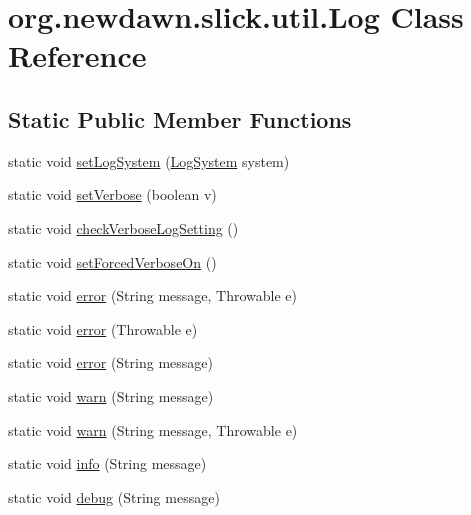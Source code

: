 \hypertarget{classorg_1_1newdawn_1_1slick_1_1util_1_1_log}{}\section{org.\+newdawn.\+slick.\+util.\+Log Class Reference}
\label{classorg_1_1newdawn_1_1slick_1_1util_1_1_log}
\subsection*{Static Public Member Functions}
\begin{DoxyCompactItemize}
\item 
static void \mbox{\hyperlink{classorg_1_1newdawn_1_1slick_1_1util_1_1_log_a74c387a36803509c62b7b7e1e6415c1c}{set\+Log\+System}} (\mbox{\hyperlink{interfaceorg_1_1newdawn_1_1slick_1_1util_1_1_log_system}{Log\+System}} system)
\item 
static void \mbox{\hyperlink{classorg_1_1newdawn_1_1slick_1_1util_1_1_log_a0d73ddb12d5b83e05963129645067699}{set\+Verbose}} (boolean v)
\item 
static void \mbox{\hyperlink{classorg_1_1newdawn_1_1slick_1_1util_1_1_log_aeb42cb2c3abf9a72353199c7dabe3b78}{check\+Verbose\+Log\+Setting}} ()
\item 
static void \mbox{\hyperlink{classorg_1_1newdawn_1_1slick_1_1util_1_1_log_a87cd4bd74b579277c3e0a6083868b324}{set\+Forced\+Verbose\+On}} ()
\item 
static void \mbox{\hyperlink{classorg_1_1newdawn_1_1slick_1_1util_1_1_log_af7c392bb99b0afd00b28d89fffd70a11}{error}} (String message, Throwable e)
\item 
static void \mbox{\hyperlink{classorg_1_1newdawn_1_1slick_1_1util_1_1_log_a549d8d55defc0302044e2c05d69ba486}{error}} (Throwable e)
\item 
static void \mbox{\hyperlink{classorg_1_1newdawn_1_1slick_1_1util_1_1_log_a5c6d71feeab34353e0c70b9899cfbf78}{error}} (String message)
\item 
static void \mbox{\hyperlink{classorg_1_1newdawn_1_1slick_1_1util_1_1_log_af9e5027a42fc8dd4ec64812ae7da79ba}{warn}} (String message)
\item 
static void \mbox{\hyperlink{classorg_1_1newdawn_1_1slick_1_1util_1_1_log_a6cce7f2804423230c52de48c0e9c71d1}{warn}} (String message, Throwable e)
\item 
static void \mbox{\hyperlink{classorg_1_1newdawn_1_1slick_1_1util_1_1_log_aa324d3f6c44b2a66707b9d87edce37f8}{info}} (String message)
\item 
static void \mbox{\hyperlink{classorg_1_1newdawn_1_1slick_1_1util_1_1_log_a495951d927703781889c7bc55dfc8a5d}{debug}} (String message)
\end{DoxyCompactItemize}
